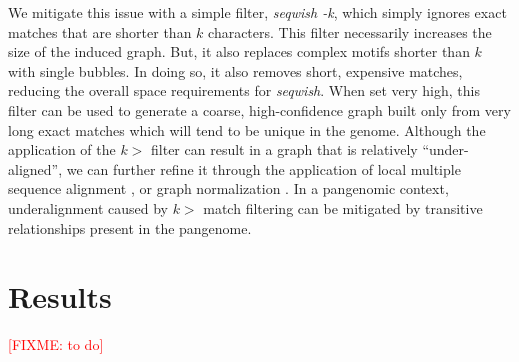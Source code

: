 \documentclass{bioinfo}
\theoremstyle{definition}
\newcommand{\red}[1]{{\textcolor{Red}{#1}}}
\newcommand{\FIXME}[1]{\red{[FIXME: #1]}}
\begin{document}
We mitigate this issue with a simple filter, \textit{seqwish -k}, which simply ignores exact matches that are shorter than $k$ characters.
This filter necessarily increases the size of the induced graph.
But, it also replaces complex motifs shorter than $k$ with single bubbles.
In doing so, it also removes short, expensive matches, reducing the overall space requirements for \textit{seqwish}.
When set very high, this filter can be used to generate a coarse, high-confidence graph built only from very long exact matches which will tend to be unique in the genome.
Although the application of the $k>$ filter can result in a graph that is relatively ``under-aligned'', we can further refine it through the application of local multiple sequence alignment \citep{Gao_2020}, or graph normalization \citep{Doerr_2021}.
In a pangenomic context, underalignment caused by $k>$ match filtering can be mitigated by transitive relationships present in the pangenome.





\section{Results}
\label{sec:results}
\FIXME{to do}
\end{document}
